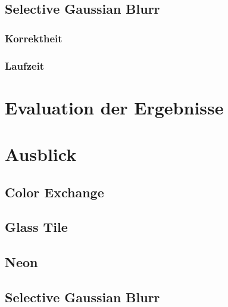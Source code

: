 \documentclass[10pt,a4paper,draft]{article}
\begin{document}
\subsection{Selective Gaussian Blurr}
\subsubsection{Korrektheit}
\subsubsection{Laufzeit}


\section{Evaluation der Ergebnisse}



\section{Ausblick}
\subsection{Color Exchange}
\subsection{Glass Tile}
\subsection{Neon}
\subsection{Selective Gaussian Blurr}
\end{document}
